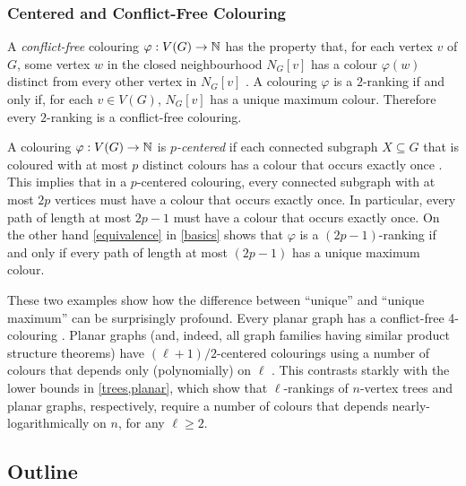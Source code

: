 \documentclass[kpfonts]{patmorin}
\newcommand{\defin}[1]{\emph{\color{brightmaroon}#1}}
\theoremstyle{named}
\begin{document}
\subsubsection{Centered and Conflict-Free Colouring}



A \defin{conflict-free} colouring $\varphi:V(G)\to\mathbb{N}$ has the property that, for each vertex $v$ of $G$, some vertex $w$ in the closed neighbourhood $N_G[v]$ has a colour $\varphi(w)$ distinct from every other vertex in $N_G[v]$ \cite{pach.tardos:conflict-free,glebov.szabo.ea:conflict-free,gargano.rescigno:complexity}. A colouring $\varphi$ is a $2$-ranking if and only if, for each $v\in V(G)$, $N_G[v]$ has a unique maximum colour.  Therefore every $2$-ranking is a conflict-free colouring.

A colouring $\varphi:V(G)\to\mathbb{N}$ is \defin{$p$-centered} if each connected subgraph $X\subseteq G$ that is coloured with at most $p$ distinct colours has a colour that occurs exactly once \cite{nesetril.ossona:tree-depth,nesetril.ossona:grad,zhu:colouring}.  This implies that in a $p$-centered colouring, every connected subgraph with at most $2p$ vertices must have a colour that occurs exactly once.  In particular, every path of length at most $2p-1$ must have a colour that occurs exactly once.  On the other hand \cref{equivalence} in \cref{basics} shows that $\varphi$ is a $(2p-1)$-ranking if and only if every path of length at most $(2p-1)$ has a unique maximum colour.

These two examples show how the difference between ``unique'' and ``unique maximum'' can be surprisingly profound.  Every planar graph has a conflict-free 4-colouring \cite{abel.alvarez.ea:conflict-free}. Planar graphs (and, indeed, all graph families having similar product structure theorems) have $(\ell+1)/2$-centered colourings using a number of colours that depends only (polynomially) on $\ell$ \cite{nesetril.ossona:grad,debski.felsner.ea:improved,pilipczuk.siebertz:polynomial}.  This contrasts starkly with the lower bounds in \cref{trees,planar}, which show that $\ell$-rankings of $n$-vertex trees and planar graphs, respectively, require a number of colours that depends nearly-logarithmically on $n$, for any $\ell\ge 2$.

\subsection{Outline}
\end{document}
